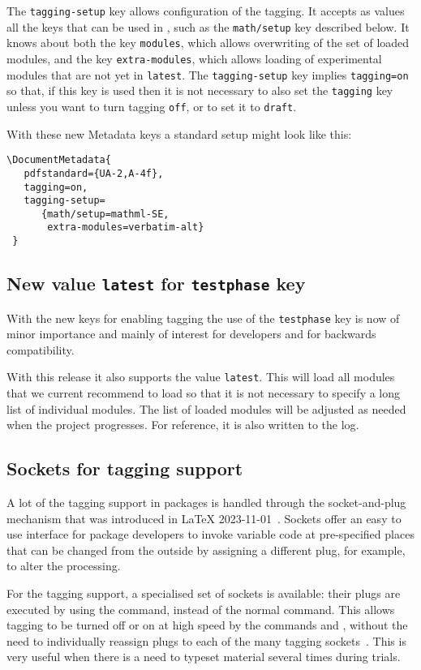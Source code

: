 \documentclass{ltnews}
\begin{document}
The \texttt{tagging-setup} key allows configuration of the tagging. It
accepts as values all the keys that can be used in ,
such as the \texttt{math/setup} key described below. It knows about both the
key \texttt{modules}, which allows overwriting of the set of loaded
modules, and the key \texttt{extra-modules}, which allows loading of
experimental modules that are not yet in \texttt{latest}. 
%
The \texttt{tagging-setup} key implies \texttt{tagging=on} so that, if
this key is used then it is not necessary to also set the \texttt{tagging}
key unless you want to turn tagging \texttt{off}, or to set it to
\texttt{draft}.

With these new Metadata keys a standard setup might look like this:
\begin{verbatim}
\DocumentMetadata{
   pdfstandard={UA-2,A-4f},
   tagging=on,
   tagging-setup=
      {math/setup=mathml-SE,
       extra-modules=verbatim-alt}
 }      
\end{verbatim}


\subsection{New value \texttt{latest} for \texttt{testphase} key}

With the new keys for enabling tagging the use of the
\texttt{testphase} key is now of minor importance and mainly of
interest for developers and for backwards compatibility.

With this release it also supports the value \texttt{latest}.  This
will load all modules that we current recommend to load so that it is not necessary to
specify a long list of individual modules. The list of loaded modules
will be adjusted as needed when the project progresses. For reference,
it is also written to the log.


\subsection{Sockets for tagging support}

A lot of the tagging support in packages is handled through the socket-and-plug 
mechanism that was introduced in \LaTeX{}
2023-11-01~\cite[p.\,93]{41:ltnews}.
%
Sockets offer an easy to use interface
for package developers to invoke variable code at pre-specified places that
can be changed from the outside by assigning a different plug, for example, to alter the processing.

For the tagging support, a specialised set of sockets is available: 
their plugs are executed
by using the   command, instead of the normal
 command. This allows tagging to be turned off or on at high
speed by the commands  and , without the need
to individually reassign plugs to each of the many tagging
sockets~\cite[p.\,97]{41:ltnews}. This is very useful 
when there is a need to typeset material several times during trials. 
\end{document}
